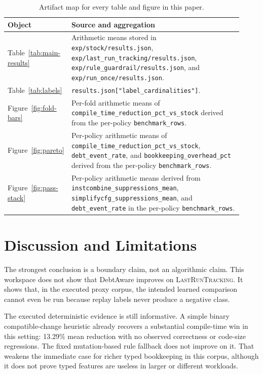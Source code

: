 \documentclass{article}
\begin{document}
\begin{table}[t]
\caption{Artifact map for every table and figure in this paper.}
\label{tab:artifact-map}
\centering
\small
\begin{tabular}{p{0.18\linewidth}p{0.74\linewidth}}
\toprule
Object & Source and aggregation \\
\midrule
Table~\ref{tab:main-results} & Arithmetic means stored in \texttt{exp/stock/results.json}, \texttt{exp/last\_run\_tracking/results.json}, \texttt{exp/rule\_guardrail/results.json}, and \texttt{exp/run\_once/results.json}. \\
Table~\ref{tab:labels} & \texttt{results.json["label\_cardinalities"]}. \\
Figure~\ref{fig:fold-bars} & Per-fold arithmetic means of \texttt{compile\_time\_reduction\_pct\_vs\_stock} derived from the per-policy \texttt{benchmark\_rows}. \\
Figure~\ref{fig:pareto} & Per-policy arithmetic means of \texttt{compile\_time\_reduction\_pct\_vs\_stock}, \texttt{debt\_event\_rate}, and \texttt{bookkeeping\_overhead\_pct} derived from the per-policy \texttt{benchmark\_rows}. \\
Figure~\ref{fig:pass-stack} & Per-policy arithmetic means derived from \texttt{instcombine\_suppressions\_mean}, \texttt{simplifycfg\_suppressions\_mean}, and \texttt{debt\_event\_rate} in the per-policy \texttt{benchmark\_rows}. \\
\bottomrule
\end{tabular}
\end{table}

\section{Discussion and Limitations}
\label{sec:discussion}

The strongest conclusion is a boundary claim, not an algorithmic claim. This workspace does not show that DebtAware improves on \textsc{LastRunTracking}. It shows that, in the executed proxy corpus, the intended learned comparison cannot even be run because replay labels never produce a negative class.

The executed deterministic evidence is still informative. A simple binary compatible-change heuristic already recovers a substantial compile-time win in this setting: 13.29\% mean reduction with no observed correctness or code-size regressions. The fixed mutation-based rule fallback does not improve on it. That weakens the immediate case for richer typed bookkeeping in this corpus, although it does not prove typed features are useless in larger or different workloads.
\end{document}
